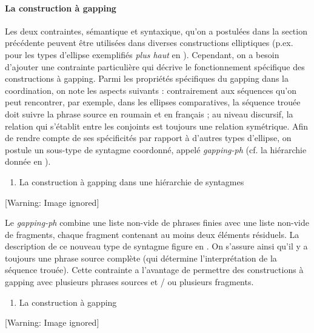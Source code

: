 \paragraph[La construction à gapping]{La construction à gapping}
\label{bkm:Ref302389376}Les deux contraintes, sémantique et syntaxique, qu'on a postulées dans la section précédente peuvent être utilisées dans diverses constructions elliptiques (p.ex. pour les types d'ellipse exemplifiés \textit{plus haut} en ). Cependant, on a besoin d'ajouter une contrainte particulière qui décrive le fonctionnement spécifique des constructions à gapping. Parmi les propriétés spécifiques du gapping dans la coordination, on note les aspects suivants : contrairement aux séquences qu'on peut rencontrer, par exemple, dans les ellipses comparatives, la séquence trouée doit suivre la phrase source en roumain et en français ; au niveau discursif, la relation qui s'établit entre les conjoints est toujours une relation symétrique. Afin de rendre compte de ses spécificités par rapport à d'autres types d'ellipse, on postule un sous-type de syntagme coordonné, appelé \textit{gapping-ph} (cf. la hiérarchie donnée en ). 


\begin{enumerate}
\item \label{bkm:Ref299955971}La construction à gapping dans une hiérarchie de syntagmes 


\end{enumerate}
{   [Warning: Image ignored] %
} 

Le \textit{gapping-ph} combine une liste non-vide de phrases finies avec une liste non-vide de fragments, chaque fragment contenant au moins deux éléments résiduels. La description de ce nouveau type de syntagme figure en . On s'assure ainsi qu'il y a toujours une phrase source complète (qui détermine l'interprétation de la séquence trouée). Cette contrainte a l'avantage de permettre des constructions à gapping avec plusieurs phrases sources et / ou plusieurs fragments. 


\begin{enumerate}
\item \label{bkm:Ref299957003}La construction à gapping


\end{enumerate}
  [Warning: Image ignored] %
 

